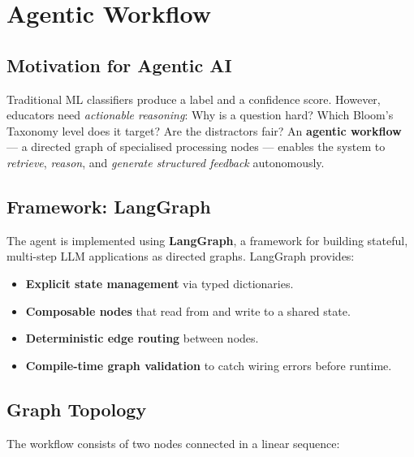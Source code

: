\documentclass[12pt, a4paper, twoside]{article}
\begin{document}
\section{Agentic Workflow}\label{sec:agentic}

\subsection{Motivation for Agentic AI}

Traditional ML classifiers produce a label and a confidence score.
However, educators need \emph{actionable reasoning}: Why is a question
hard? Which Bloom's Taxonomy level does it target? Are the distractors
fair? An \textbf{agentic workflow} --- a directed graph of specialised
processing nodes --- enables the system to \emph{retrieve}, \emph{reason},
and \emph{generate structured feedback} autonomously.

\subsection{Framework: LangGraph}

The agent is implemented using \textbf{LangGraph}, a framework for
building stateful, multi-step LLM applications as directed graphs.
LangGraph provides:

\begin{itemize}[leftmargin=2em]
    \item \textbf{Explicit state management} via typed dictionaries.
    \item \textbf{Composable nodes} that read from and write to a
          shared state.
    \item \textbf{Deterministic edge routing} between nodes.
    \item \textbf{Compile-time graph validation} to catch wiring
          errors before runtime.
\end{itemize}

\subsection{Graph Topology}

The workflow consists of two nodes connected in a linear sequence:
\end{document}
